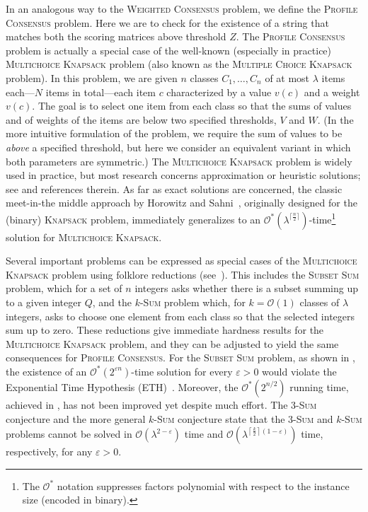 \documentclass{article}
\theoremstyle{plain}
\theoremstyle{definition}
\newcommand{\MK}{\textsc{Multichoice Knapsack}\xspace}
\newcommand{\WC}{\textsc{Weighted Consensus}\xspace}
\newcommand{\PC}{\textsc{Profile Consensus}\xspace}
\newcommand{\Knapsack}{\textsc{Knapsack}\xspace}
\newcommand{\SubsetSum}{\textsc{Subset Sum}\xspace}
\newcommand{\Sum}{\textsc{Sum}\xspace}
\newcommand{\ceil}[1]{\left\lceil #1 \right\rceil}
\newcommand{\Oh}{\mathcal{O}}
\newcommand{\Ohstar}{\mathcal{O}^*}
\begin{document}
  In an analogous way to the \WC problem, we define the \PC problem.
  Here we are to check for the existence of a string that matches both the scoring matrices above threshold $Z$.
  The \PC problem is actually a special case of the well-known (especially in practice) \MK problem
  (also known as the \textsc{Multiple Choice Knapsack} problem).
  In this problem, we are given $n$ classes $C_1,\ldots,C_n$ of at most $\lambda$ items each---$N$ items in total---each item $c$ characterized by a value $v(c)$ and a weight $v(c)$.
  The goal is to select one item from each class so that the sums of values and of weights of the items are
  below two specified thresholds, $V$ and $W$.
  (In the more intuitive formulation of the problem, we require the sum of values to be \emph{above} a specified threshold,
  but here we consider an equivalent variant in which both parameters are symmetric.)
  The \MK problem is widely used in practice, but most research concerns approximation or heuristic solutions;
  see \cite{DBLP:books/daglib/0010031} and references therein.
  As far as exact solutions are concerned, the classic meet-in-the middle approach by Horowitz and Sahni~\cite{DBLP:journals/jacm/HorowitzS74},
  originally designed for the (binary) \Knapsack problem, immediately generalizes to 
  an $\Oh^*(\lambda^{\lceil{\frac{n}{2}\rceil}})$-time\footnote{The $\Oh^*$ notation suppresses factors polynomial with respect to the instance size (encoded in binary). } solution for \MK. 
  


  Several important problems can be expressed as special cases of the \MK problem using folklore reductions (see~\cite{DBLP:books/daglib/0010031}).
  This includes the \SubsetSum problem, which for a set of $n$ integers asks whether there is a subset summing up to a given integer $Q$,
  and the $k$-\Sum problem which, for $k=\Oh(1)$ classes of $\lambda$ integers, asks to choose one element from each
  class so that the selected integers sum up to zero. 
  These reductions give immediate hardness results for the \MK problem, and they can be adjusted to yield the same consequences for \PC.
  For the \SubsetSum problem, as shown in \cite{DBLP:conf/mfcs/EtscheidKMR15,DBLP:books/daglib/0069796}, the existence of an $\Ohstar(2^{\varepsilon n})$-time solution for every $\varepsilon > 0$
  would violate the Exponential Time Hypothesis (ETH)~\cite{DBLP:journals/jcss/ImpagliazzoP01,ETHsurvey}.
  Moreover, the $\Oh^*(2^{n/2})$ running time, achieved in \cite{DBLP:journals/jacm/HorowitzS74}, has not been improved yet despite much effort.
  The 3-\Sum conjecture \cite{DBLP:journals/comgeo/GajentaanO95} and the more general $k$-\Sum conjecture state that the 3-\Sum and $k$-\Sum problems cannot be solved in
  $\Oh(\lambda^{2-\varepsilon})$ time and $\Oh(\lambda^{\ceil{\frac{k}{2}}(1-\varepsilon)})$ time, respectively, for any $\varepsilon>0$.
\end{document}
